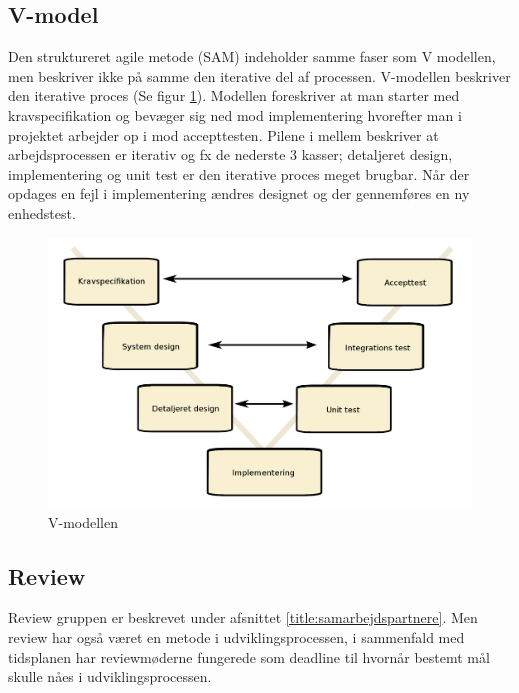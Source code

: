 \subsection{V-model}
Den struktureret agile metode (SAM) indeholder samme faser som V modellen, men beskriver ikke på samme den iterative del af processen. V-modellen beskriver den iterative proces (Se figur \ref{fig:vmodel}). Modellen foreskriver at man starter med kravspecifikation og bevæger sig ned mod implementering hvorefter man i projektet arbejder op i mod accepttesten. Pilene i mellem beskriver at arbejdsprocessen er iterativ og fx de nederste 3 kasser; detaljeret design, implementering og unit test er den iterative proces meget brugbar. Når der opdages en fejl i implementering ændres designet og der gennemføres en ny enhedstest.  
\begin{figure}[H]
	\includegraphics[width = \textwidth]{billeder/vmodel.png}
	\caption{V-modellen}\label{fig:vmodel}
\end{figure}

\subsection{Review}
Review gruppen er beskrevet under afsnittet \ref{title:samarbejdspartnere}. Men review har også været en metode i udviklingsprocessen, i sammenfald med tidsplanen har reviewmøderne fungerede som deadline til hvornår bestemt mål skulle nåes i udviklingsprocessen. 

\newpage

